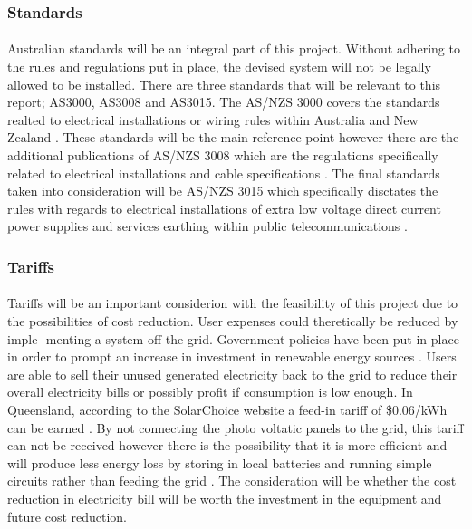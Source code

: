 \paragraph{}

\subsubsection{Standards}

\paragraph{}
Australian standards will be an integral part of this project. Without adhering to the rules and regulations put in place, the devised system will not be legally allowed to be installed. There are three standards that will be relevant to this report; AS3000, AS3008 and AS3015. The AS/NZS 3000 covers the standards realted to electrical installations or wiring rules within Australia and New Zealand \cite{StandardsAustralia2007}. These standards will be the main reference point however there are the additional publications of AS/NZS 3008 which are the regulations specifically related to electrical installations and cable specifications \cite{StandardsAustralia2010}. The final standards taken into consideration will be AS/NZS 3015 which specifically disctates the rules with regards to electrical installations of extra low voltage direct current power supplies and services earthing within public telecommunications \cite{StandardsAustralia2004}.    

\subsubsection{Tariffs}

\paragraph{}
Tariffs will be an important considerion with the feasibility of this project due to the
possibilities of cost reduction. User expenses could theretically be reduced by imple-
menting a system off the grid. Government policies have been put in place in order
to prompt an increase in investment in renewable energy sources \cite{Nelson2011}. Users are able to sell their unused generated electricity back to the grid to reduce their overall electricity
bills or possibly profit if consumption is low enough. In Queensland, according to the
SolarChoice website a feed-in tariff of \$0.06/kWh can be earned \cite{website:SolarChoice}. By not connecting the photo voltatic panels to the grid, this tariff can not be received however there is the possibility that it is more efficient and will produce less energy loss by storing in local
batteries and running simple circuits rather than feeding the grid \cite{AntoniouATzimasARowland2015}. The consideration will be whether the cost reduction in electricity bill will be worth the investment in the equipment and future cost reduction.   


